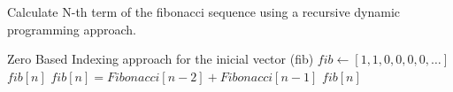 \documentclass[12pt]{article}
\begin{document}
\begin{algorithm}

  \caption{Calculate N-th term of the fibonacci sequence using a recursive dynamic programming approach.}
  \begin{algorithmic}[1]
    \Ensure Zero Based Indexing approach for the inicial vector (fib)
    \State $fib \gets [1, 1, 0, 0, 0, 0, \dots]$
    \Statex
            \State \Return $fib[n]$
        \EndIf
        \State $fib[n] = Fibonacci[n - 2] + Fibonacci[n - 1]$
        \State \Return $fib[n]$
    \EndFunction
  \end{algorithmic}
  
\end{algorithm}
\end{document}
